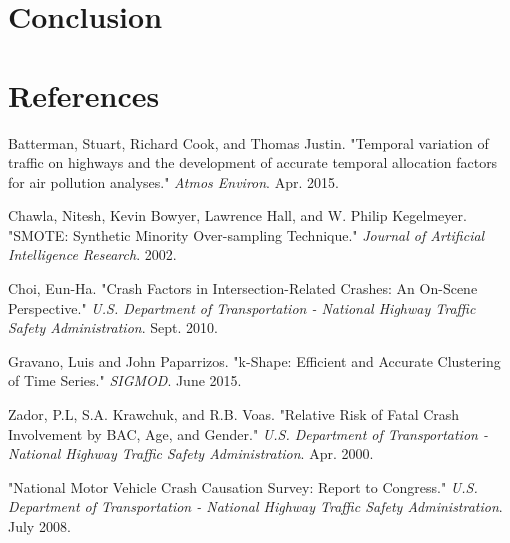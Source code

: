 \documentclass[11pt, oneside,titlepage]{article}   	%
\begin{document}
\section*{Conclusion}

\section*{References}
\begin{hangparas}{1.27cm}{1}
Batterman, Stuart, Richard Cook, and Thomas Justin. "Temporal variation of traffic on highways and the development of accurate temporal allocation factors for air pollution analyses." \textit{Atmos Environ}. Apr. 2015.

Chawla, Nitesh, Kevin Bowyer, Lawrence Hall, and W. Philip Kegelmeyer. "SMOTE: Synthetic Minority Over-sampling Technique." \textit{Journal of Artificial Intelligence Research}. 2002.

Choi, Eun-Ha. "Crash Factors in Intersection-Related Crashes: An On-Scene Perspective." \textit{U.S. Department of Transportation - National Highway Traffic Safety Administration}. Sept. 2010.

Gravano, Luis and John Paparrizos. "k-Shape: Efficient and Accurate Clustering of Time Series." \textit{SIGMOD}. June 2015.

Zador, P.L, S.A. Krawchuk, and R.B. Voas. "Relative Risk of Fatal Crash Involvement by BAC, Age, and Gender." \textit{U.S. Department of Transportation - National Highway Traffic Safety Administration}. Apr. 2000.

"National Motor Vehicle Crash Causation Survey: Report to Congress." \textit{U.S. Department of Transportation - National Highway Traffic Safety Administration}. July 2008.


\end{hangparas}
\end{document}
